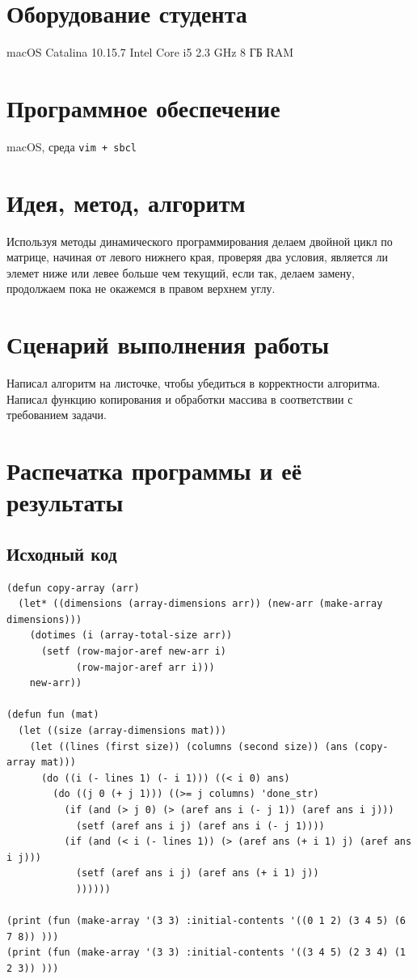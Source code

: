 \documentclass[15pt]{extarticle}
\begin{document}
\section{Оборудование студента}
macOS Catalina 10.15.7 Intel Core i5 2.3 GHz 8 ГБ RAM

\section{Программное обеспечение}
macOS, среда {\tt vim + sbcl}

\section{Идея, метод, алгоритм}
Используя методы динамического программирования делаем двойной цикл по матрице, начиная от левого нижнего края, проверяя два условия, является ли элемет ниже или левее больше чем текущий, если так, делаем замену, продолжаем пока не окажемся в правом верхнем углу.

\section{Сценарий выполнения работы}
Написал алгоритм на листочке, чтобы убедиться в корректности алгоритма. Написал функцию копирования и обработки массива в соответствии с требованием задачи.

\section{Распечатка программы и её результаты}

\subsection{Исходный код}

\begin{lstlisting}
(defun copy-array (arr)
  (let* ((dimensions (array-dimensions arr)) (new-arr (make-array dimensions)))
    (dotimes (i (array-total-size arr))
      (setf (row-major-aref new-arr i)
            (row-major-aref arr i)))
    new-arr))

(defun fun (mat)
  (let ((size (array-dimensions mat)))
    (let ((lines (first size)) (columns (second size)) (ans (copy-array mat)))
      (do ((i (- lines 1) (- i 1))) ((< i 0) ans)
        (do ((j 0 (+ j 1))) ((>= j columns) 'done_str)
          (if (and (> j 0) (> (aref ans i (- j 1)) (aref ans i j)))
            (setf (aref ans i j) (aref ans i (- j 1))))
          (if (and (< i (- lines 1)) (> (aref ans (+ i 1) j) (aref ans i j)))
            (setf (aref ans i j) (aref ans (+ i 1) j))
            ))))))

(print (fun (make-array '(3 3) :initial-contents '((0 1 2) (3 4 5) (6 7 8)) )))
(print (fun (make-array '(3 3) :initial-contents '((3 4 5) (2 3 4) (1 2 3)) )))
\end{lstlisting}
\end{document}
